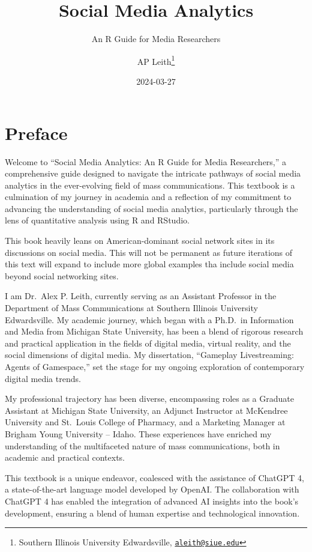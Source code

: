 \documentclass[
]{book}
\title{Social Media Analytics}
\subtitle{An R Guide for Media Researchers}
\author{AP Leith\footnote{Southern Illinois University Edwardsville, \href{mailto:aleith@siue.edu}{\nolinkurl{aleith@siue.edu}}}}
\date{2024-03-27}
\begin{document}
\maketitle

{
\setcounter{tocdepth}{1}
\tableofcontents
}
\hypertarget{preface}{%
\chapter*{Preface}\label{preface}}

Welcome to ``Social Media Analytics: An R Guide for Media Researchers,'' a comprehensive guide designed to navigate the intricate pathways of social media analytics in the ever-evolving field of mass communications. This textbook is a culmination of my journey in academia and a reflection of my commitment to advancing the understanding of social media analytics, particularly through the lens of quantitative analysis using R and RStudio.

This book heavily leans on American-dominant social network sites in its discussions on social media. This will not be permanent as future iterations of this text will expand to include more global examples tha include social media beyond social networking sites.

I am Dr.~Alex P. Leith, currently serving as an Assistant Professor in the Department of Mass Communications at Southern Illinois University Edwardsville. My academic journey, which began with a Ph.D.~in Information and Media from Michigan State University, has been a blend of rigorous research and practical application in the fields of digital media, virtual reality, and the social dimensions of digital media. My dissertation, ``Gameplay Livestreaming: Agents of Gamespace,'' set the stage for my ongoing exploration of contemporary digital media trends.

My professional trajectory has been diverse, encompassing roles as a Graduate Assistant at Michigan State University, an Adjunct Instructor at McKendree University and St.~Louis College of Pharmacy, and a Marketing Manager at Brigham Young University -- Idaho. These experiences have enriched my understanding of the multifaceted nature of mass communications, both in academic and practical contexts.

This textbook is a unique endeavor, coalesced with the assistance of ChatGPT 4, a state-of-the-art language model developed by OpenAI. The collaboration with ChatGPT 4 has enabled the integration of advanced AI insights into the book's development, ensuring a blend of human expertise and technological innovation.
\end{document}
